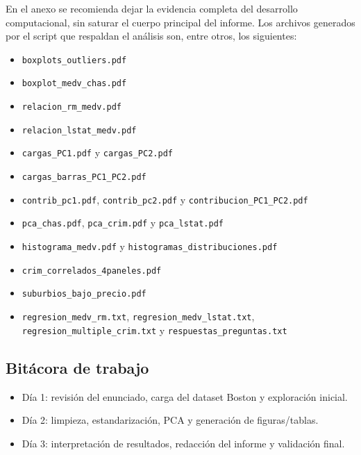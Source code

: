 En el anexo se recomienda dejar la evidencia completa del desarrollo computacional, sin saturar el cuerpo principal del informe. Los archivos generados por el script que respaldan el an\'alisis son, entre otros, los siguientes:

\begin{itemize}
    \item \texttt{boxplots\_outliers.pdf}
    \item \texttt{boxplot\_medv\_chas.pdf}
    \item \texttt{relacion\_rm\_medv.pdf}
    \item \texttt{relacion\_lstat\_medv.pdf}
    \item \texttt{cargas\_PC1.pdf} y \texttt{cargas\_PC2.pdf}
    \item \texttt{cargas\_barras\_PC1\_PC2.pdf}
    \item \texttt{contrib\_pc1.pdf}, \texttt{contrib\_pc2.pdf} y \texttt{contribucion\_PC1\_PC2.pdf}
    \item \texttt{pca\_chas.pdf}, \texttt{pca\_crim.pdf} y \texttt{pca\_lstat.pdf}
    \item \texttt{histograma\_medv.pdf} y \texttt{histogramas\_distribuciones.pdf}
    \item \texttt{crim\_correlados\_4paneles.pdf}
    \item \texttt{suburbios\_bajo\_precio.pdf}
    \item \texttt{regresion\_medv\_rm.txt}, \texttt{regresion\_medv\_lstat.txt}, \texttt{regresion\_multiple\_crim.txt} y \texttt{respuestas\_preguntas.txt}
\end{itemize}

\subsection{Bit\'acora de trabajo}
\begin{itemize}
    \item D\'ia 1: revisi\'on del enunciado, carga del dataset Boston y exploraci\'on inicial.
    \item D\'ia 2: limpieza, estandarizaci\'on, PCA y generaci\'on de figuras/tablas.
    \item D\'ia 3: interpretaci\'on de resultados, redacci\'on del informe y validaci\'on final.
\end{itemize}